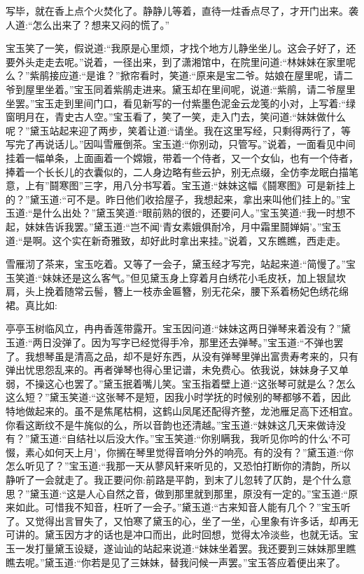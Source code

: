 \begin{parag}
    写毕，就在香上点个火焚化了。静静儿等着，直待一炷香点尽了，才开门出来。袭人道:“怎么出来了？想来又闷的慌了。”
\end{parag}

\begin{parag}
    宝玉笑了一笑，假说道:“我原是心里烦，才找个地方儿静坐坐儿。这会子好了，还要外头走走去呢。”说着，一径出来，到了潇湘馆中，在院里问道:“林妹妹在家里呢么？”紫鹃接应道:“是谁？”掀帘看时，笑道:“原来是宝二爷。姑娘在屋里呢，请二爷到屋里坐着。”宝玉同着紫鹃走进来。黛玉却在里间呢，说道:“紫鹃，请二爷屋里坐罢。”宝玉走到里间门口，看见新写的一付紫墨色泥金云龙笺的小对，上写着:“绿窗明月在，青史古人空。”宝玉看了，笑了一笑，走入门去，笑问道:“妹妹做什么呢？”黛玉站起来迎了两步，笑着让道:“请坐。我在这里写经，只剩得两行了，等写完了再说话儿。”因叫雪雁倒茶。宝玉道:“你别动，只管写。”说着，一面看见中间挂着一幅单条，上面画着一个嫦娥，带着一个侍者，又一个女仙，也有一个侍者，捧着一个长长儿的衣囊似的，二人身边略有些云护，别无点缀，全仿李龙眠白描笔意，上有”鬪寒图”三字，用八分书写着。宝玉道:“妹妹这幅《鬪寒图》可是新挂上的？”黛玉道:“可不是。昨日他们收拾屋子，我想起来，拿出来叫他们挂上的。”宝玉道:“是什么出处？”黛玉笑道:“眼前熟的很的，还要问人。”宝玉笑道:“我一时想不起，妹妹告诉我罢。”黛玉道:“岂不闻‘青女素娥俱耐冷，月中霜里鬪婵娟’。”宝玉道:“是啊。这个实在新奇雅致，却好此时拿出来挂。”说着，又东瞧瞧，西走走。
\end{parag}


\begin{parag}
    雪雁沏了茶来，宝玉吃着。又等了一会子，黛玉经才写完，站起来道:“简慢了。”宝玉笑道:“妹妹还是这么客气。”但见黛玉身上穿着月白绣花小毛皮袄，加上银鼠坎肩，头上挽着随常云髻，簪上一枝赤金匾簪，别无花朵，腰下系着杨妃色绣花绵裙。真比如:
\end{parag}


\begin{qute2sp}
    亭亭玉树临风立，冉冉香莲带露开。宝玉因问道:“妹妹这两日弹琴来着没有？”黛玉道:“两日没弹了。因为写字已经觉得手冷，那里还去弹琴。”宝玉道:“不弹也罢了。我想琴虽是清高之品，却不是好东西，从没有弹琴里弹出富贵寿考来的，只有弹出忧思怨乱来的。再者弹琴也得心里记谱，未免费心。依我说，妹妹身子又单弱，不操这心也罢了。”黛玉抿着嘴儿笑。宝玉指着壁上道:“这张琴可就是么？怎么这么短？”黛玉笑道:“这张琴不是短，因我小时学抚的时候别的琴都够不着，因此特地做起来的。虽不是焦尾枯桐，这鹤山凤尾还配得齐整，龙池雁足高下还相宜。你看这断纹不是牛旄似的么，所以音韵也还清越。”宝玉道:“妹妹这几天来做诗没有？”黛玉道:“自结社以后没大作。”宝玉笑道:“你别瞒我，我听见你吟的什么‘不可惙，素心如何天上月’，你搁在琴里觉得音响分外的响亮。有的没有？”黛玉道:“你怎么听见了？”宝玉道:“我那一天从蓼风轩来听见的，又恐怕打断你的清韵，所以静听了一会就走了。我正要问你:前路是平韵，到末了儿忽转了仄韵，是个什么意思？”黛玉道:“这是人心自然之音，做到那里就到那里，原没有一定的。”宝玉道:“原来如此。可惜我不知音，枉听了一会子。”黛玉道:“古来知音人能有几个？”宝玉听了。又觉得出言冒失了，又怕寒了黛玉的心，坐了一坐，心里象有许多话，却再无可讲的。黛玉因方才的话也是冲口而出，此时回想，觉得太冷淡些，也就无话。宝玉一发打量黛玉设疑，遂讪讪的站起来说道:“妹妹坐着罢。我还要到三妹妹那里瞧瞧去呢。”黛玉道:“你若是见了三妹妹，替我问候一声罢。”宝玉答应着便出来了。
\end{qute2sp}


